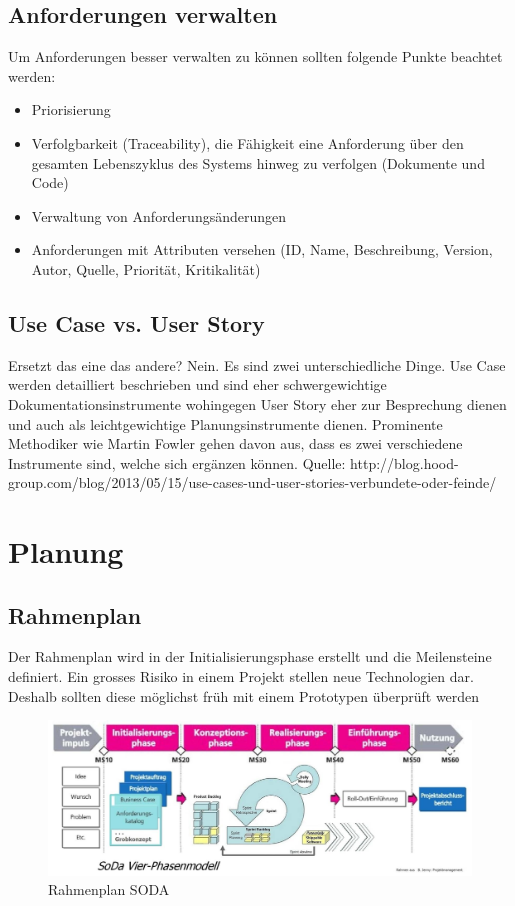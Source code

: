 \subsection{Anforderungen verwalten}

Um Anforderungen besser verwalten zu können sollten folgende Punkte beachtet werden:
\begin{itemize}
	\item Priorisierung
	\item Verfolgbarkeit (Traceability), die Fähigkeit eine Anforderung über den gesamten Lebenszyklus des Systems hinweg zu verfolgen (Dokumente und Code)
	\item Verwaltung von Anforderungsänderungen
	\item Anforderungen mit Attributen versehen (ID, Name, Beschreibung, Version, Autor, Quelle, Priorität, Kritikalität) 
\end{itemize}

\subsection{Use Case vs. User Story}
Ersetzt das eine das andere? Nein. Es sind zwei unterschiedliche Dinge. Use Case werden detailliert beschrieben und sind eher schwergewichtige Dokumentationsinstrumente wohingegen User Story eher zur Besprechung dienen und auch als leichtgewichtige Planungsinstrumente dienen. Prominente Methodiker wie Martin Fowler gehen davon aus, dass es zwei verschiedene Instrumente sind, welche sich ergänzen können. Quelle: http://blog.hood-group.com/blog/2013/05/15/use-cases-und-user-stories-verbundete-oder-feinde/

\section{Planung}

\subsection{Rahmenplan}

Der Rahmenplan wird in der Initialisierungsphase erstellt und die Meilensteine definiert. Ein grosses Risiko in einem Projekt stellen neue Technologien dar. Deshalb sollten diese möglichst früh mit einem Prototypen überprüft werden

\begin{figure}[h!]
\centering
\includegraphics[width=0.8\linewidth]{fig/rahmenplan}
\caption{Rahmenplan SODA}
\label{fig:rahmenplan}
\end{figure}

